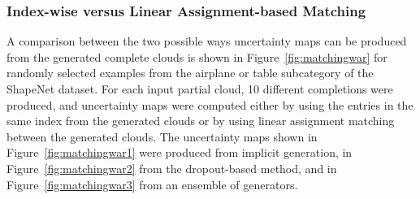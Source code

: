         \subsubsection{Index-wise versus Linear Assignment-based Matching}
        A comparison between the two possible ways uncertainty maps can be produced from the generated complete clouds is shown in Figure~\ref{fig:matchingwar} for randomly selected examples from the airplane or table subcategory of the ShapeNet dataset. For each input partial cloud, 10 different completions were produced, and uncertainty maps were computed either by using the entries in the same index from the generated clouds or by using linear assignment matching between the generated clouds. The uncertainty maps shown in Figure~\ref{fig:matchingwar1} were produced from implicit generation, in Figure~\ref{fig:matchingwar2} from the dropout-based method, and in Figure~\ref{fig:matchingwar3} from an ensemble of generators.
